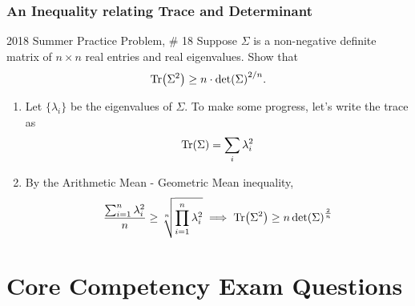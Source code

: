 \documentclass[../main]{subfiles}
\begin{document}
\subsubsection{An Inequality relating Trace and Determinant}
\begin{bbox}{{2018 Summer Practice Problem, \# 18}}
Suppose $\Sigma$ is a non-negative definite matrix of $n\times n$ real entries and real eigenvalues. Show that 
\[
\Tr(\Sigma^2) \geq n \cdot \det(\Sigma)^{2/n}.
\]
\end{bbox}
\begin{solution}
    \begin{enumerate}
        \item Let $\{\lambda_i\}$ be the eigenvalues of $\Sigma$. To make some progress, let's write the trace as 
        \[
        \Tr(\Sigma) = \sum_i \lambda_i^2        
        \]
        \item By the Arithmetic Mean - Geometric Mean inequality,
        \[
        \frac{\sum_{i=1}^n \lambda_i^2}{n} \geq \sqrt[n]{\prod_{i=1}^n \lambda_i^2} \implies \Tr(\Sigma^2) \geq n \det(\Sigma)^{\frac{2}{n}}
        \]
    \end{enumerate}
\end{solution}
\section{Core Competency Exam Questions}
\end{document}

